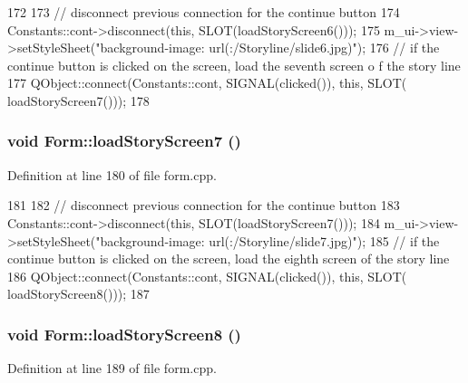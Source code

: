 \begin{DoxyCode}
172 {
173     // disconnect previous connection for the continue button
174     Constants::cont->disconnect(this, SLOT(loadStoryScreen6()));
175     m_ui->view->setStyleSheet("background-image: url(:/Storyline/slide6.jpg)");
176     // if the continue button is clicked on the screen, load the seventh screen o
      f the story line
177     QObject::connect(Constants::cont, SIGNAL(clicked()), this, SLOT(
      loadStoryScreen7()));
178 }
\end{DoxyCode}
\hypertarget{class_form_a8da2b417a6315a6bb664a1cea4389b4c}{
\subsubsection[{loadStoryScreen7}]{\setlength{\rightskip}{0pt plus 5cm}void Form::loadStoryScreen7 ()}}
\label{class_form_a8da2b417a6315a6bb664a1cea4389b4c}


Definition at line 180 of file form.cpp.


\begin{DoxyCode}
181 {
182     // disconnect previous connection for the continue button
183     Constants::cont->disconnect(this, SLOT(loadStoryScreen7()));
184     m_ui->view->setStyleSheet("background-image: url(:/Storyline/slide7.jpg)");
185     // if the continue button is clicked on the screen, load the eighth screen of
       the story line
186     QObject::connect(Constants::cont, SIGNAL(clicked()), this, SLOT(
      loadStoryScreen8()));
187 }
\end{DoxyCode}
\hypertarget{class_form_abeec47265874e8a36c8e0cd0fdf00fc5}{
\subsubsection[{loadStoryScreen8}]{\setlength{\rightskip}{0pt plus 5cm}void Form::loadStoryScreen8 ()}}
\label{class_form_abeec47265874e8a36c8e0cd0fdf00fc5}


Definition at line 189 of file form.cpp.


